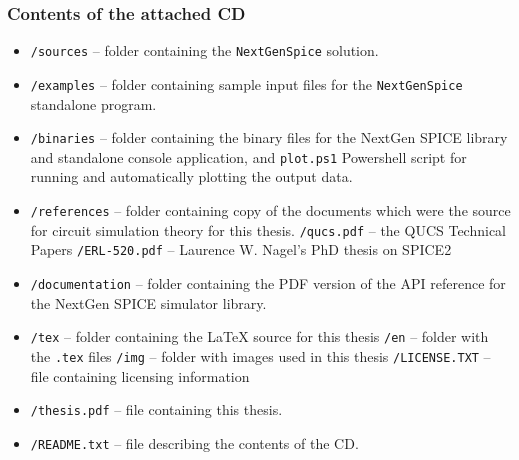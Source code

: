 \subsubsection{Contents of the attached CD}
\begin{itemize}
	\item \texttt{/sources} -- folder containing the \texttt{NextGenSpice} solution.
	\item \texttt{/examples} -- folder containing sample input files for the \texttt{NextGenSpice} standalone program.
	\item \texttt{/binaries} -- folder containing the binary files for the NextGen SPICE library and standalone console application, and \texttt{plot.ps1} Powershell script for running and automatically plotting the output data.
	\item \texttt{/references} -- folder containing copy of the documents which were the source for circuit simulation theory for this thesis.
	\subitem \texttt{/qucs.pdf} -- the QUCS Technical Papers \cite{qucs}
	\subitem \texttt{/ERL-520.pdf} -- Laurence W. Nagel's PhD thesis on SPICE2 \cite{Nagel:M520}
	\item \texttt{/documentation} -- folder containing the PDF version of the API reference for the NextGen SPICE simulator library.
	\item \texttt{/tex} -- folder containing the \LaTeX{} source for this thesis
	\subitem \texttt{/en} -- folder with the \texttt{.tex} files
	\subitem \texttt{/img} -- folder with images used in this thesis
	\subitem \texttt{/LICENSE.TXT} -- file containing licensing information
	\item \texttt{/thesis.pdf} -- file containing this thesis.
	\item \texttt{/README.txt} -- file describing the contents of the CD.
\end{itemize}